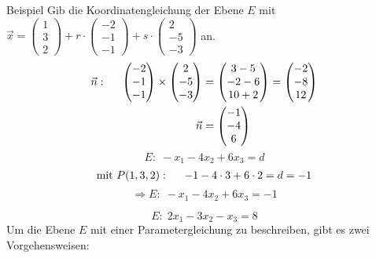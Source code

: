 \documentclass{article}
\begin{document}
\begin{boxx}[DarkBlue]{Beispiel}
    Gib die Koordinatengleichung der Ebene $E$ mit $\displaystyle \vec{x} = \begin{pmatrix}1\\3\\2\end{pmatrix} + r \cdot \begin{pmatrix}-2\\-1\\-1\end{pmatrix} + s \cdot \begin{pmatrix}2\\-5\\-3\end{pmatrix}$ an.
    \begin{align*}
        \vec{n}:\hspace*{5mm} \begin{pmatrix}-2\\-1\\-1\end{pmatrix} \times \begin{pmatrix}2\\-5\\-3\end{pmatrix} &=  \begin{pmatrix}3-5\\-2-6\\10+2\end{pmatrix} =  \begin{pmatrix}-2\\-8\\12\end{pmatrix} \\
        \vec{n} &=  \begin{pmatrix}-1\\-4\\6\end{pmatrix}
    \end{align*}
    \[E:\; -x_1 - 4x_2 + 6x_3 = d\]
    \begin{align*}
        \text{mit }P(1,3,2):\hspace*{5mm} -1-4\cdot3+6\cdot2 = d = - 1
    \end{align*}
    \[\Rightarrow E:\; -x_1 - 4x_2 + 6x_3 = -1\]
\end{boxx}
\[E:\; 2x_1 - 3x_2 -x_3 = 8\]
Um die Ebene $E$ mit einer Parametergleichung zu beschreiben, gibt es zwei Vorgehensweisen:
\end{document}
